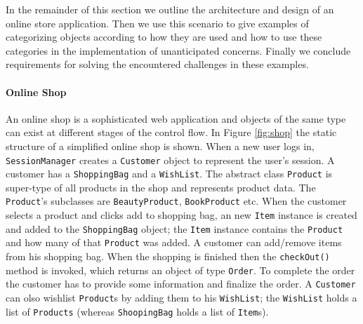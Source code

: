 In the remainder of this section we outline the architecture and design of an online store application. Then we use this scenario to give examples of categorizing objects according to how they are used and how to use these categories in the implementation of unanticipated concerns. Finally we conclude requirements for solving the encountered challenges in these examples.

\paragraph{Online Shop}
An online shop is a sophisticated web application and objects of the same type can exist at different stages of the control flow. In Figure \ref{fig:shop} the static structure of a simplified online shop is shown. When a new user logs in, \texttt{SessionManager} creates a \texttt{Customer} object to represent the user's session. A customer has a \texttt{ShoppingBag} and a \texttt{WishList}. The abstract class \texttt{Product} is super-type of all products in the shop and represents product data. The \texttt{Product}'s subclasses are \texttt{BeautyProduct}, \texttt{BookProduct} etc. When the customer selects a product and clicks add to shopping bag, an new \texttt{Item} instance is created and added to the \texttt{ShoppingBag} object; the \texttt{Item} instance contains the \texttt{Product} and how many of that \texttt{Product} was added. A customer can add/remove items from his shopping bag. When the shopping is finished then the \texttt{checkOut()} method is invoked, which returns an object of type \texttt{Order}. To complete the order the customer has to provide some information and finalize the order. A \texttt{Customer} can olso wishlist \texttt{Product}s by adding them to his \texttt{WishList}; the \texttt{WishList} holds a list of \texttt{Products} (whereas \texttt{ShoopingBag} holds a list of \texttt{Item}s).


